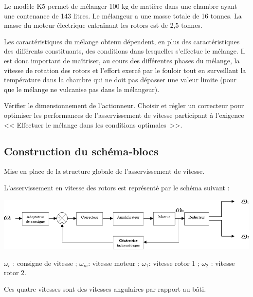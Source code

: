 \documentclass[10pt,fleqn]{article} %
\begin{document}
\begin{multicols}{2}
Le modèle K5 permet de mélanger 100 kg de matière dans une chambre ayant une contenance de 143 litres. Le mélangeur a une masse totale de 16 tonnes. La masse du moteur électrique entraînant les rotors est de 2,5 tonnes.

Les caractéristiques du mélange obtenu dépendent, en plus des caractéristiques des différents constituants, des conditions dans lesquelles s'effectue le mélange. Il est donc important de maîtriser, au cours des différentes phases du mélange, la vitesse de rotation des rotors et l'effort exercé par le fouloir tout en surveillant la température dans la chambre qui ne doit pas dépasser une valeur limite (pour que le mélange ne vulcanise pas dans le mélangeur).
 




\begin{obj}
Vérifier le dimensionnement de l'actionneur. Choisir et régler un correcteur pour optimiser les performances de l'asservissement de vitesse participant à l'exigence << Effectuer le mélange dans les conditions optimales~>>.
\end{obj}



\subsection*{Construction du schéma-blocs}
\begin{obj}
Mise en place de la structure globale de l’asservissement de vitesse.
\end{obj}

L'asservissement en vitesse des rotors est représenté par le schéma suivant :

\begin{center}
\includegraphics[width=\linewidth]{images/e3a_01}
\end{center}

$\omega_c$ : consigne de vitesse ;  $\omega_m$: vitesse moteur ; $\omega_1$: vitesse rotor 1 ; $\omega_2$ : vitesse rotor 2.

\begin{rem}
Ces quatre vitesses sont des vitesses angulaires par rapport au bâti.
\end{rem}


\end{multicols}
\end{document}
